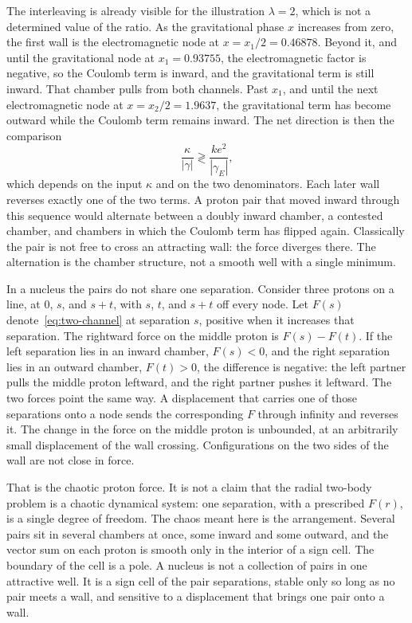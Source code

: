 \documentclass[a4paper]{article}
\begin{document}
The interleaving is already visible for the illustration \(\lambda=2\), which is not a determined value of the ratio. As the gravitational phase \(x\) increases from zero, the first wall is the electromagnetic node at \(x=x_1/2=0.46878\). Beyond it, and until the gravitational node at \(x_1=0.93755\), the electromagnetic factor is negative, so the Coulomb term is inward, and the gravitational term is still inward. That chamber pulls from both channels. Past \(x_1\), and until the next electromagnetic node at \(x=x_2/2=1.9637\), the gravitational term has become outward while the Coulomb term remains inward. The net direction is then the comparison
\begin{equation}
\label{eq:contest}
\frac{\kappa}{|\gamma|}
  \gtrless
  \frac{k e^{2}}{|\gamma_E|},
\end{equation}
which depends on the input \(\kappa\) and on the two denominators. Each later wall reverses exactly one of the two terms. A proton pair that moved inward through this sequence would alternate between a doubly inward chamber, a contested chamber, and chambers in which the Coulomb term has flipped again. Classically the pair is not free to cross an attracting wall: the force diverges there. The alternation is the chamber structure, not a smooth well with a single minimum.

In a nucleus the pairs do not share one separation. Consider three protons on a line, at \(0\), \(s\), and \(s+t\), with \(s\), \(t\), and \(s+t\) off every node. Let \(F(s)\) denote~\eqref{eq:two-channel} at separation \(s\), positive when it increases that separation. The rightward force on the middle proton is \(F(s)-F(t)\). If the left separation lies in an inward chamber, \(F(s)<0\), and the right separation lies in an outward chamber, \(F(t)>0\), the difference is negative: the left partner pulls the middle proton leftward, and the right partner pushes it leftward. The two forces point the same way. A displacement that carries one of those separations onto a node sends the corresponding \(F\) through infinity and reverses it. The change in the force on the middle proton is unbounded, at an arbitrarily small displacement of the wall crossing. Configurations on the two sides of the wall are not close in force.

That is the chaotic proton force. It is not a claim that the radial two-body problem is a chaotic dynamical system: one separation, with a prescribed \(F(r)\), is a single degree of freedom. The chaos meant here is the arrangement. Several pairs sit in several chambers at once, some inward and some outward, and the vector sum on each proton is smooth only in the interior of a sign cell. The boundary of the cell is a pole. A nucleus is not a collection of pairs in one attractive well. It is a sign cell of the pair separations, stable only so long as no pair meets a wall, and sensitive to a displacement that brings one pair onto a wall.
\end{document}
